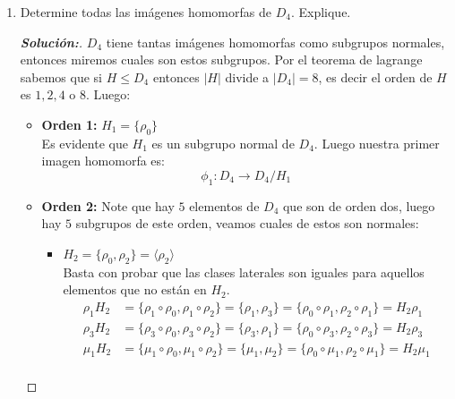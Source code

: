 \documentclass[12pt]{article}
\begin{document}
\begin{enumerate}
\begin{proof}[\textbf{Solución:}]
\begin{itemize}
        Ahora note que la única forma de que $6n=0$ en $\mathbb{Z}_{10}$ es que $n=5k$ con $k\in\mathbb{Z}^+$ ya que $6n=6(5k)=30k=10(3k)=0$.
        \item $n<0$\\
        Observe que $n=-k$ con $k\in\mathbb{Z}^+$, luego:
        $$\phi(n)=\phi(-k)=-\phi(k)=-(6k)$$
        Por el anterior ítem, $k$ tiene que ser múltiplo de $5$ para que sea $0$ y por tanto $n=-5m$ con $m\in\mathbb{Z}^+$.
    \end{itemize}
    De esto podemos concluir que todos los elementos del kernel son de la forma $5k$ con $k\in\mathbb{Z}$. Concluyendo así que:
    $$\text{ker}\phi=5\mathbb{Z}$$
    \end{proof}
    \item Determine todas las imágenes homomorfas de $D_4$. Explique.
    \begin{proof}[\textbf{Solución:}] $D_4$ tiene tantas imágenes homomorfas como subgrupos normales, entonces miremos cuales son estos subgrupos. Por el teorema de lagrange sabemos que si $H\leq D_4$ entonces $|H|$ divide a $|D_4|=8$, es decir el orden de $H$ es $1,2,4$ o $8$. Luego:
    \begin{itemize}
        \item \textbf{Orden 1: } $H_1=\{\rho_0\}$\\
        Es evidente que $H_1$ es un subgrupo normal de $D_4$. Luego nuestra primer imagen homomorfa es:
        $$\phi_1:D_4\to D_4/H_1$$
        \item \textbf{Orden 2:} Note que hay $5$ elementos de $D_4$ que son de orden dos, luego hay $5$ subgrupos de este orden, veamos cuales de estos son normales:
        \begin{itemize}
            \item $H_2=\{\rho_0,\rho_2\}=\langle\rho_2\rangle$\\
            Basta con probar que las clases laterales son iguales para aquellos elementos que no están en $H_2$.
            \begin{align*}
                \rho_1H_2&=\{\rho_1\circ\rho_0,\rho_1\circ\rho_2\}=\{\rho_1,\rho_3\}=\{\rho_0\circ\rho_1,\rho_2\circ\rho_1\}=H_2\rho_1\\
                \rho_3H_2&=\{\rho_3\circ\rho_0,\rho_3\circ\rho_2\}=\{\rho_3,\rho_1\}=\{\rho_0\circ\rho_3,\rho_2\circ\rho_3\}=H_2\rho_3\\
                \mu_1H_2&=\{\mu_1\circ\rho_0,\mu_1\circ\rho_2\}=\{\mu_1,\mu_2\}=\{\rho_0\circ\mu_1,\rho_2\circ\mu_1\}=H_2\mu_1\\

\end{align*}
\end{itemize}
\end{itemize}
\end{proof}
\end{enumerate}
\end{document}
